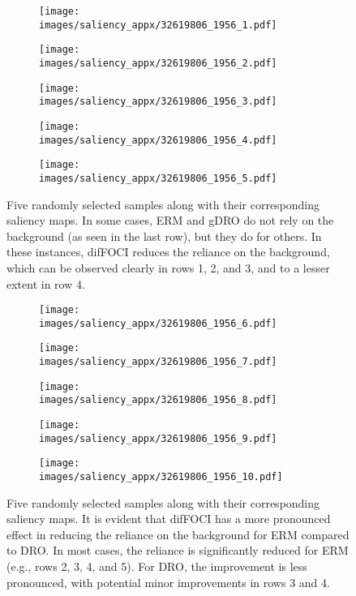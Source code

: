 \begin{figure}[htbp]
  \centering
  \begin{subfigure}{0.9\textwidth}
    \texttt{[image: images/saliency\_appx/32619806\_1956\_1.pdf]}
  \end{subfigure}
  \begin{subfigure}{0.9\textwidth}
    \texttt{[image: images/saliency\_appx/32619806\_1956\_2.pdf]}
  \end{subfigure}
  \begin{subfigure}{0.9\textwidth}
    \texttt{[image: images/saliency\_appx/32619806\_1956\_3.pdf]}
  \end{subfigure}
  \begin{subfigure}{0.9\textwidth}
    \texttt{[image: images/saliency\_appx/32619806\_1956\_4.pdf]}
  \end{subfigure}
    \begin{subfigure}{0.9\textwidth}
    \texttt{[image: images/saliency\_appx/32619806\_1956\_5.pdf]}
  \end{subfigure}
  \caption{Five randomly selected samples along with their corresponding saliency maps. In some cases, ERM and gDRO do not rely on the background (as seen in the last row), but they do for others. In these instances, difFOCI reduces the reliance on the background, which can be observed clearly in rows 1, 2, and 3, and to a lesser extent in row 4.}
  \label{fig:birds1}
\end{figure}


\begin{figure}[htbp]
  \centering
  \begin{subfigure}{0.9\textwidth}
    \texttt{[image: images/saliency\_appx/32619806\_1956\_6.pdf]}
  \end{subfigure}
  \begin{subfigure}{0.9\textwidth}
    \texttt{[image: images/saliency\_appx/32619806\_1956\_7.pdf]}
  \end{subfigure}
  \begin{subfigure}{0.9\textwidth}
    \texttt{[image: images/saliency\_appx/32619806\_1956\_8.pdf]}
  \end{subfigure}
\begin{subfigure}{0.9\textwidth}
    \texttt{[image: images/saliency\_appx/32619806\_1956\_9.pdf]}
  \end{subfigure}
\begin{subfigure}{0.9\textwidth}
    \texttt{[image: images/saliency\_appx/32619806\_1956\_10.pdf]}
  \end{subfigure}
  \caption{Five randomly selected samples along with their corresponding saliency maps. It is evident that difFOCI has a more pronounced effect in reducing the reliance on the background for ERM compared to DRO. In most cases, the reliance is significantly reduced for ERM (e.g., rows 2, 3, 4, and 5). For DRO, the improvement is less pronounced, with potential minor improvements in rows 3 and 4.}
  \label{fig:birds2}
\end{figure}


